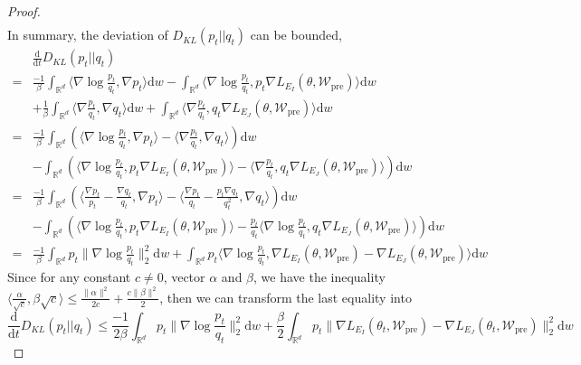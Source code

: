\begin{proof}
$$\begin{aligned}
	\end{aligned}
	$$
	In summary, the deviation of $D_{KL}(p_t||q_t)$ can be bounded,
	$$
	\begin{aligned}
		&\frac{\mathrm{d}}{\mathrm{d}t}D_{KL}(p_t||q_t) \\
		=& \frac{-1}\beta\int_{\mathbb{R}^d}\langle\nabla\log\frac{p_t}{q_t},\nabla p_t\rangle\mathrm{d}w-\int_{\mathbb{R}^d}\langle\nabla\log\frac{p_t}{q_t},p_t\nabla L_{E_I}(\theta, \mathcal{W}_{\text{pre}})\rangle\mathrm{d}w \\
		&+ \frac{1}\beta\int_{\mathbb{R}^d}\langle\nabla\frac{p_t}{q_t},\nabla q_t\rangle\mathrm{d}w + \int_{\mathbb{R}^d}\langle\nabla\frac{p_t}{q_t},q_t\nabla L_{E_J}(\theta, \mathcal{W}_{\text{pre}})\rangle\mathrm{d}w \\
		=& \frac{-1}{\beta}\int_{\mathbb{R}^d}\left(\langle\nabla\log\frac{p_t}{q_t},\nabla p_t\rangle-\langle\nabla\frac{p_t}{q_t},\nabla q_t\rangle\right)\mathrm{d}w \\
		&- \int_{\mathbb{R}^d}\left(\langle\nabla\log\frac{p_t}{q_t},p_t\nabla L_{E_I}(\theta, \mathcal{W}_{\text{pre}})\rangle-\langle\nabla\frac{p_t}{q_t},q_t\nabla L_{E_J}(\theta, \mathcal{W}_{\text{pre}})\rangle\right)\mathrm{d}w \\
		=& \frac{-1}{\beta}\int_{\mathbb{R}^d}\left(\langle \frac{\nabla p_t}{p_t}-\frac{\nabla q_t}{q_t},\nabla p_t\rangle-\langle\frac{\nabla p_t}{q_t}-\frac{p_t\nabla q_t}{q_t^2},\nabla q_t\rangle\right)\mathrm{d}w \\ & - \int_{\mathbb{R}^d}\left(\langle\nabla\log\frac{p_t}{q_t},p_t\nabla L_{E_I}(\theta, \mathcal{W}_{\text{pre}})\rangle-\frac{p_t}{q_t}\langle\nabla\log\frac{p_t}{q_t},q_t\nabla L_{E_J}(\theta, \mathcal{W}_{\text{pre}})\rangle\right)\mathrm{d}w \\
		=& \frac{-1}{\beta}\int_{\mathbb{R}^d}p_t\big\|\nabla \log \frac{p_t}{q_t}\big\|^2_2 \mathrm{d}w + \int_{\mathbb{R}^d}p_t\langle\nabla \log \frac{p_t}{q_t}, \nabla L_{E_I}(\theta, \mathcal{W}_{\text{pre}})-\nabla L_{E_J}(\theta, \mathcal{W}_{\text{pre}})\rangle\mathrm{d}w
	\end{aligned}
	$$
	Since for any constant $c \neq 0$, vector $\alpha$ and $\beta$, we have the inequality $\langle\frac{\alpha}{\sqrt{c}},\beta\sqrt{c}\rangle \leq \frac{\|\alpha\|^2}{2c}+\frac{c\|\beta\|^2}{2}$, then we can transform the last equality into
	$$
	\frac{\mathrm{d}}{\mathrm{d}t}D_{KL}(p_t||q_t) \leq \frac{-1}{2\beta}\int_{\mathbb{R}^d}p_t\big\|\nabla \log \frac{p_t}{q_t}\big\|^2_2 \mathrm{d}w + \frac{\beta}{2}\int_{\mathbb{R}^d} p_t \big\|\nabla L_{E_I}(\theta_t, \mathcal{W}_{\text{pre}})-\nabla L_{E_J}(\theta_t, \mathcal{W}_{\text{pre}})\big\|^2_2\mathrm{d}w
$$
\end{proof}
